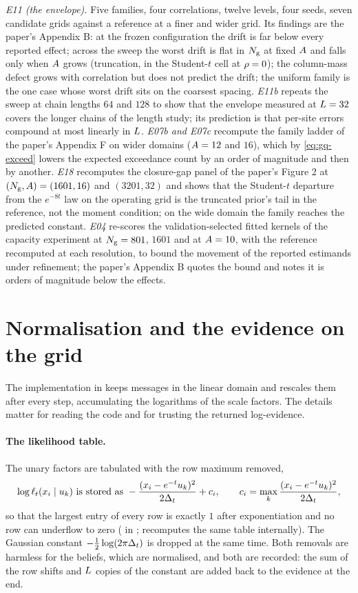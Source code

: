 \emph{E11 (the envelope).} Five families, four correlations, twelve levels, four seeds,
seven candidate grids against a reference at a finer and wider grid. Its findings are
the paper's Appendix B: at the frozen configuration the drift is far below every
reported effect; across the sweep the worst drift is flat in $N_{\mathrm{g}}$ at fixed
$A$ and falls only when $A$ grows (truncation, in the Student-$t$
cell at $\rho=0$); the column-mass defect grows with correlation but does not
predict the drift; the uniform family is the one case whose worst drift sits on the
coarsest spacing. \emph{E11b} repeats the sweep at chain lengths $64$ and $128$ to
show that the envelope measured at $L=32$ covers the longer chains of the length
study; its prediction is that per-site errors compound at most linearly in $L$.
\emph{E07b and E07c} recompute the family ladder of the paper's Appendix F on wider
domains ($A=12$ and $16$), which by \cref{eq:gq-exceed} lowers the expected
exceedance count by an order of magnitude and then by another. \emph{E18} recomputes
the closure-gap panel of the paper's Figure 2 at $(N_{\mathrm{g}},A)=(1601,16)$ and
$(3201,32)$ and shows that the Student-$t$ departure from the $e^{-8t}$ law on the
operating grid is the truncated prior's tail in the reference, not the moment
condition; on the wide domain the family reaches the predicted constant. \emph{E04}
re-scores the validation-selected fitted kernels of the capacity experiment at
$N_{\mathrm{g}}=801$, $1601$ and at $A=10$, with the reference recomputed at each
resolution, to bound the movement of the reported estimands under refinement; the
paper's Appendix B quotes the bound and notes it is orders of magnitude below the
effects.

\section{Normalisation and the evidence on the grid}
\label{sec:gq-normalisation}

The implementation in  keeps messages in the
linear domain and rescales them after every step, accumulating the logarithms of the
scale factors. The details matter for reading the code and for trusting the returned
log-evidence.

\paragraph{The likelihood table.}
The unary factors are tabulated with the row maximum removed,
\[
  \log\ell_t(x_i\mid u_{k})\ \text{is stored as}\ -\frac{(x_i-e^{-t}u_{k})^2}{2\Delta_t}+c_i,\qquad
  c_i=\max_k\frac{(x_i-e^{-t}u_{k})^2}{2\Delta_t},
\]
so that the largest entry of every row is exactly $1$ after exponentiation and no row can
underflow to zero ( in ;
 recomputes the same table internally). The Gaussian constant
$-\tfrac12\log(2\pi\Delta_t)$ is dropped at the same time. Both removals are harmless for
the beliefs, which are normalised, and both are recorded: the sum of the row shifts
and $L$ copies of the constant are added back to the evidence at the end.

